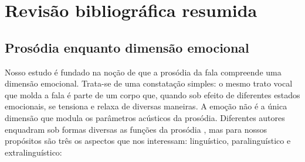 \documentclass[a4paper]{tufte-handout}
\begin{document}

\section{Revisão bibliográfica resumida}\label{sec:revisao_bibliografica}

\subsection{Prosódia enquanto dimensão emocional}

Nosso estudo é fundado na noção de que a prosódia da fala compreende uma dimensão emocional. Trata-se de uma constatação simples: o mesmo trato vocal que molda a fala é parte de um corpo que, quando sob efeito de diferentes estados emocionais, se tensiona e relaxa de diversas maneiras. A emoção não é a única dimensão que modula os parâmetros acústicos da prosódia. Diferentes autores enquadram sob formas diversas as funções da prosódia \citep{schotz2002linguistic}, mas para nossos propósitos são três os aspectos que nos interessam: linguístico, paralinguístico e extralinguístico: 
\end{document}
